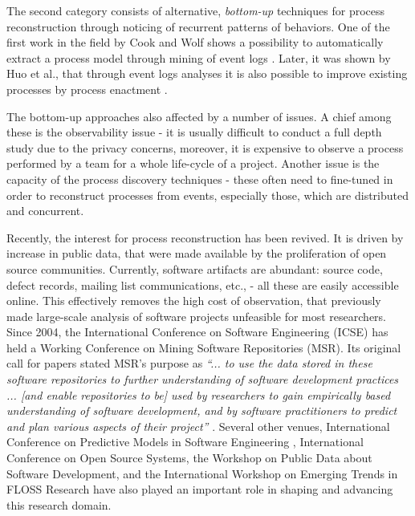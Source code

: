The second category consists of alternative, \textit{bottom-up} techniques for process reconstruction through
noticing of recurrent patterns of behaviors. One of the first work in the field by Cook and Wolf
shows a possibility to automatically extract a process model through mining of event logs
\cite{citeulike:328044} \cite{citeulike:5120757} \cite{citeulike:5128143}. Later, it was shown by Huo et al., that
through event logs analyses it is also possible to improve existing processes by process enactment
\cite{citeulike:7691059} \cite{citeulike:7690766}. 

The bottom-up approaches also affected by a number of issues. A chief among these is the observability
issue - it is usually difficult to conduct a full depth study due to the privacy concerns, moreover, it is expensive
to observe a process performed by a team for a whole life-cycle of a project. 
Another issue is the capacity of the process discovery techniques - these often need to fine-tuned in order to
reconstruct processes from events, especially those, which are distributed and concurrent. 

Recently, the interest for process reconstruction has been revived. It is driven by increase in public data, that were
made available by the proliferation of open source communities. Currently, software artifacts are abundant: source
code, defect records, mailing list communications, etc., - all these are easily accessible online. This effectively
removes the high cost of observation, that previously made large-scale analysis of software projects unfeasible 
for most researchers. Since 2004, the International Conference on Software Engineering (ICSE) has 
held a Working Conference on Mining Software Repositories (MSR). 
Its original call for papers stated MSR's purpose as \textit{``... to use the data stored in these 
software repositories to further understanding of software development practices ... 
[and enable repositories to be] 
used by researchers to gain empirically based understanding of software development, 
and by software practitioners to predict and plan various aspects of their project''}
\cite{msr2004} \cite{citeulike:7853299}. 
Several other venues, International Conference on Predictive Models in Software Engineering \cite{promise12}, 
International Conference on Open Source Systems, 
the Workshop on Public Data about Software Development, 
and the International Workshop on Emerging Trends in FLOSS Research have also played
an important role in shaping and advancing this research domain.

